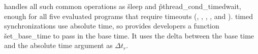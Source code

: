 
\parrot handles all such common operations as \v{sleep} and
\v{pthread\_cond\_timedwait}, enough for all five evaluated programs
that require timeouts (\pbzip, \bdb, \mplayer, \imagick, and \redis).
\pthread timed synchronizations use absolute time, so \parrot provides
developers a function \v{set\_base\_time} to pass in the base time.  It
uses the delta between the base time and the absolute time argument as $\Delta
t_r$.







